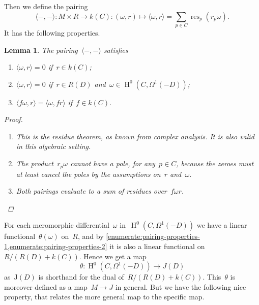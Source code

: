 \documentclass[10pt,a4paper]{article}
\theoremstyle{lecture}
\newtheorem{lemma}[theorem]{Lemma}
\DeclareMathOperator\HH{H}
\DeclareMathOperator\res{res}
\begin{document}
Then we define the pairing
\begin{equation}
  \langle-,-\rangle\colon M\times R\to k(C):(\omega,r)\mapsto\langle\omega,r\rangle=\sum_{p\in C}\res_p(r_p\omega).
\end{equation}
It has the following properties.
\begin{lemma}
  \label{lemma:pairing-properties}
  The pairing~$\langle-,-\rangle$ satisfies
  \begin{enumerate}
    \item\label{enumerate:pairing-properties-1} $\langle\omega,r\rangle=0$ if~$r\in k(C)$;
    \item\label{enumerate:pairing-properties-2} $\langle\omega,r\rangle=0$ if~$r\in R(D)$ and~$\omega\in\HH^0(C,\Omega^1(-D))$;
    \item\label{enumerate:pairing-properties-3} $\langle f\omega,r\rangle=\langle\omega,fr\rangle$ if~$f\in k(C)$.
  \end{enumerate}

  \begin{proof}
    \begin{enumerate}
      \item This is the residue theorem, as known from complex analysis. It is also valid in this algebraic setting.
      \item The product~$r_p\omega$ cannot have a pole, for any~$p\in C$, because the zeroes must at least cancel the poles by the assumptions on~$r$ and~$\omega$.
      \item Both pairings evaluate to a sum of residues over~$f\omega r$.
    \end{enumerate}
  \end{proof}
\end{lemma}
For each meromorphic differential~$\omega$ in~$\HH^0(C,\Omega^1(-D))$ we have a linear functional~$\theta(\omega)$ on~$R$, and by \cref{enumerate:pairing-properties-1,enumerate:pairing-properties-2} it is also a linear functional on~$R/(R(D)+k(C))$. Hence we get a map
\begin{equation}
  \theta\colon\HH^0(C,\Omega^1(-D))\to J(D)
\end{equation}
as~$\mathrm{J}(D)$ is shorthand for the dual of~$R/(R(D)+k(C))$. This~$\theta$ is moreover defined as a map~$M\to J$ in general. But we have the following nice property, that relates the more general map to the specific map.
\end{document}

